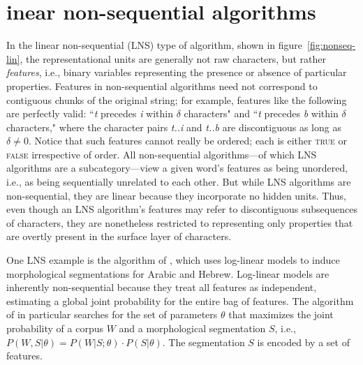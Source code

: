 
\section{inear non-sequential algorithms}
\label{subsec:nonseq-lin}
In the linear non-sequential  (LNS) type of algorithm, shown in figure~\ref{fig:nonseq-lin}, the representational units are generally not raw characters, but rather \emph{features}, i.e., binary variables representing the presence or absence of particular properties.
Features in non-sequential algorithms need not correspond to contiguous chunks of the original string; for example, features like the following are perfectly valid: ``\textit{t} precedes \textit{i} within $\delta$ characters" and ``\textit{t} precedes \textit{b} within $\delta$ characters," where the character pairs \emph{t..i} and \emph{t..b} are discontiguous as long as $\delta \ne 0$. Notice that such features cannot really be ordered; each is either \textsc{true} or \textsc{false} irrespective of order.
All non-sequential algorithms---of which LNS algorithms are a subcategory---view a given word's features as being unordered, i.e., as being sequentially unrelated to each other. 
But while LNS algorithms are non-sequential, they are linear because they incorporate no hidden units. Thus, even though an LNS algorithm's features may refer to discontiguous subsequences of characters, they are nonetheless restricted to representing only properties that are overtly present in the surface layer of characters. 

One LNS example is the algorithm of \cite{poon-et-al:2009}, which uses log-linear models to induce morphological segmentations for Arabic and Hebrew. 
Log-linear models are inherently non-sequential because they treat all features as independent, estimating a global joint probability for the entire bag of features. 
The algorithm of \cite{poon-et-al:2009} in particular searches for the set of parameters $\theta$ that maximizes the joint probability of a corpus $W$ and a morphological segmentation $S$, i.e., $P(W,S| \theta) = P(W|S; \theta) \cdot P(S| \theta)$. The segmentation $S$ is encoded by a set of features.

